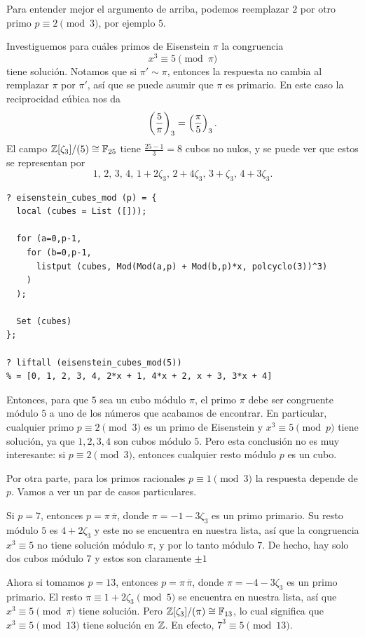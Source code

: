 Para entender mejor el argumento de arriba, podemos reemplazar $2$ por otro
primo $p \equiv 2 \pmod{3}$, por ejemplo $5$.

\begin{ejemplo}
  Investiguemos para cuáles primos de Eisenstein $\pi$ la congruencia
  $$x^3 \equiv 5\pmod{\pi}$$  
  tiene solución. Notamos que si $\pi' \sim \pi$, entonces
  la respuesta no cambia al remplazar $\pi$ por $\pi'$, así que se puede
  asumir que $\pi$ es primario. En este caso la reciprocidad cúbica nos da
  $$\left(\frac{5}{\pi}\right)_3 = \left(\frac{\pi}{5}\right)_3.$$
  El campo $\mathbb{Z}[\zeta_3]/(5) \cong \mathbb{F}_{25}$ tiene $\frac{25-1}{3} = 8$ cubos
  no nulos, y se puede ver que estos se representan por
  \[ 1, \, 2, \, 3, \, 4, \,
         1 + 2\zeta_3, \, 2 + 4\zeta_3, \, 3 + \zeta_3, \, 4 + 3\zeta_3. \]

  \begin{shaded}
\begin{verbatim}
? eisenstein_cubes_mod (p) = {
  local (cubes = List ([]));

  for (a=0,p-1,
    for (b=0,p-1,
      listput (cubes, Mod(Mod(a,p) + Mod(b,p)*x, polcyclo(3))^3)
    )
  );

  Set (cubes)
};

? liftall (eisenstein_cubes_mod(5))
% = [0, 1, 2, 3, 4, 2*x + 1, 4*x + 2, x + 3, 3*x + 4]
\end{verbatim}
  \end{shaded}

  Entonces, para que $5$ sea un cubo módulo $\pi$, el primo $\pi$ debe ser
  congruente módulo $5$ a uno de los números que acabamos de encontrar. En
  particular, cualquier primo $p \equiv 2 \pmod{3}$ es un primo de Eisenstein y
  $x^3 \equiv 5 \pmod{p}$ tiene solución, ya que $1,2,3,4$ son cubos módulo $5$.
  Pero esta conclusión no es muy interesante: si $p \equiv 2 \pmod{3}$, entonces
  cualquier resto módulo $p$ es un cubo.

  Por otra parte, para los primos racionales $p \equiv 1 \pmod{3}$ la respuesta
  depende de $p$. Vamos a ver un par de casos particulares.

  Si $p = 7$, entonces $p = \pi\,\overline{\pi}$, donde $\pi = -1 - 3\zeta_3$ es
  un primo primario. Su resto módulo $5$ es $4 + 2\zeta_3$ y este no se
  encuentra en nuestra lista, así que la congruencia $x^3 \equiv 5$ no tiene
  solución módulo $\pi$, y por lo tanto módulo $7$. De hecho, hay solo dos
  cubos módulo $7$ y estos son claramente $\pm 1$

  Ahora si tomamos $p = 13$, entonces $p = \pi\,\overline{\pi}$, donde
  $\pi = -4 - 3\zeta_3$ es un primo primario. El resto
  $\pi \equiv 1 + 2\zeta_3 \pmod{5}$ se encuentra en nuestra lista, así que
  $x^3 \equiv 5 \pmod{\pi}$ tiene solución.
  Pero $\mathbb{Z} [\zeta_3]/(\pi) \cong \mathbb{F}_{13}$, lo cual significa que
  $x^3 \equiv 5 \pmod{13}$ tiene solución en $\mathbb{Z}$.
  En efecto, $7^3 \equiv 5 \pmod{13}$.
\end{ejemplo}

